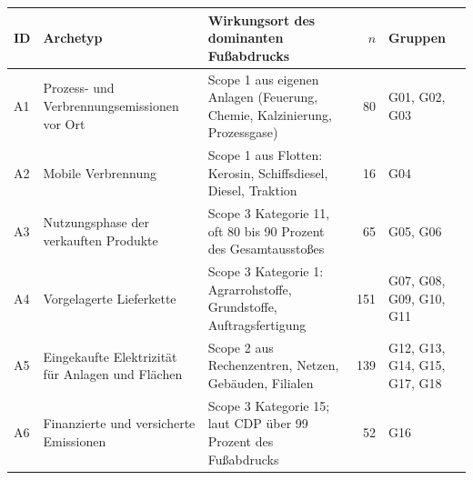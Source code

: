 \begin{tabularx}{\linewidth}{@{}l l X r P{2.3cm}@{}}
\toprule
ID & Archetyp & Wirkungsort des dominanten Fußabdrucks & $n$ & Gruppen \\
\midrule
A1 & Prozess- und Verbrennungsemissionen vor Ort & Scope 1 aus eigenen Anlagen (Feuerung, Chemie, Kalzinierung, Prozessgase) & 80 & G01, G02, G03 \\
A2 & Mobile Verbrennung & Scope 1 aus Flotten: Kerosin, Schiffsdiesel, Diesel, Traktion & 16 & G04 \\
A3 & Nutzungsphase der verkauften Produkte & Scope 3 Kategorie 11, oft 80 bis 90 Prozent des Gesamtausstoßes & 65 & G05, G06 \\
A4 & Vorgelagerte Lieferkette & Scope 3 Kategorie 1: Agrarrohstoffe, Grundstoffe, Auftragsfertigung & 151 & G07, G08, G09, G10, G11 \\
A5 & Eingekaufte Elektrizität für Anlagen und Flächen & Scope 2 aus Rechenzentren, Netzen, Gebäuden, Filialen & 139 & G12, G13, G14, G15, G17, G18 \\
A6 & Finanzierte und versicherte Emissionen & Scope 3 Kategorie 15; laut CDP über 99 Prozent des Fußabdrucks & 52 & G16 \\
\bottomrule
\end{tabularx}
